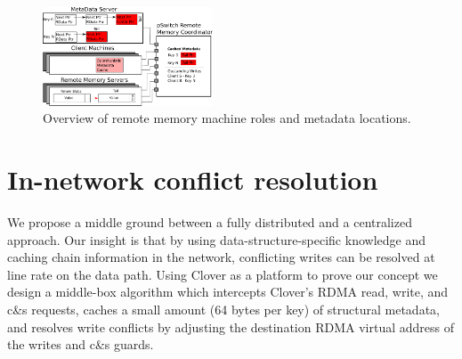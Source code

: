 
\begin{figure}
    \includegraphics[width=0.45\textwidth]{fig/overview_2.png}
    \caption{Overview of remote memory machine roles and metadata
    locations.}
    \label{fig:overview}
\end{figure}

\section{In-network conflict resolution}

We propose a middle ground between a fully distributed and a
centralized approach.  Our insight is that by using
data-structure-specific knowledge and caching chain information in the
network, conflicting writes can be resolved at line rate on the data
path.  Using Clover as a platform to prove our concept we design a
middle-box algorithm which intercepts Clover's RDMA read,
write, and c\&s requests, caches a small amount (64 bytes per key) of
structural metadata, and resolves write conflicts by adjusting the
destination RDMA virtual address of the writes and c\&s guards.

